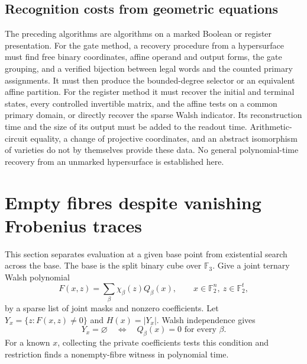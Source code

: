 \subsection{Recognition costs from geometric equations}
The preceding algorithms are algorithms on a marked Boolean or register presentation. For the gate method, a recovery procedure from a hypersurface must find free binary coordinates, affine operand and output forms, the gate grouping, and a verified bijection between legal words and the counted primary assignments. It must then produce the bounded-degree selector or an equivalent affine partition. For the register method it must recover the initial and terminal states, every controlled invertible matrix, and the affine tests on a common primary domain, or directly recover the sparse Walsh indicator. Its reconstruction time and the size of its output must be added to the readout time. Arithmetic-circuit equality, a change of projective coordinates, and an abstract isomorphism of varieties do not by themselves provide these data. No general polynomial-time recovery from an unmarked hypersurface is established here.

\section{Empty fibres despite vanishing Frobenius traces}
\label{sec:split-fibres}
This section separates evaluation at a given base point from existential search across the base. The base is the split binary cube over $\mathbb F_3$. Give a joint ternary Walsh polynomial
\[
 F(x,z)=\sum_{\beta}\chi_\beta(z)Q_\beta(x),
 \qquad x\in\mathbb F_2^n,\ z\in\mathbb F_2^t,
\]
by a sparse list of joint masks and nonzero coefficients. Let $Y_x=\{z:F(x,z)\ne0\}$ and $H(x)=|Y_x|$. Walsh independence gives
\begin{equation}
\label{st:eq:empty-rows}
 Y_x=\varnothing\quad\Longleftrightarrow\quad
 Q_\beta(x)=0\text{ for every }\beta.
\end{equation}
For a known $x$, collecting the private coefficients tests this condition and restriction finds a nonempty-fibre witness in polynomial time.

